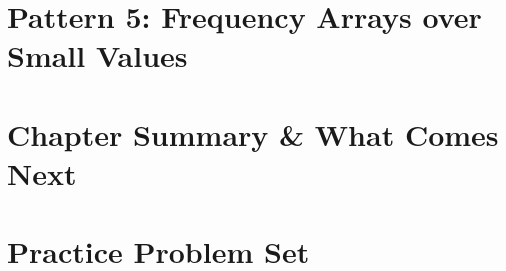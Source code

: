 \clearpage
\section{Pattern 5: Frequency Arrays over Small Values}
\label{sec:ch1-p5}





\clearpage
\section{Chapter Summary \& What Comes Next}
\label{sec:ch1-summary}


\clearpage
\section{Practice Problem Set}
\label{sec:ch1-problems}

\clearpage

